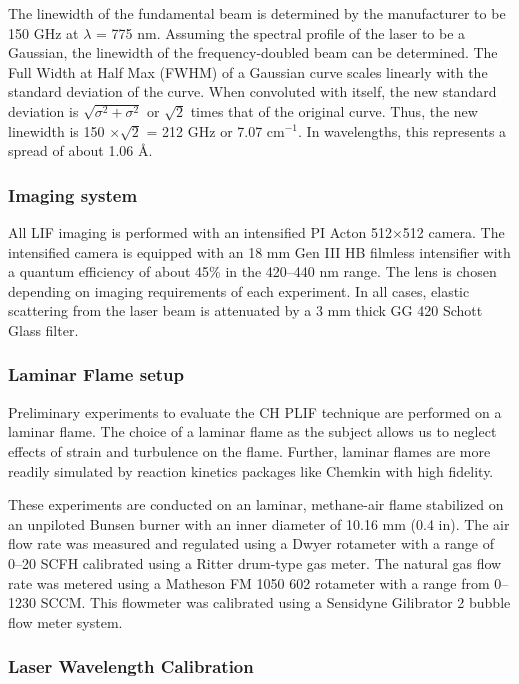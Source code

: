 The linewidth of the fundamental beam is determined by the manufacturer to be 150 GHz at \(\lambda\) = 775 nm.
Assuming the spectral profile of the laser to be a Gaussian, the linewidth of the frequency-doubled beam can be determined.
The Full Width at Half Max (FWHM) of a Gaussian curve scales linearly with the standard deviation of the curve.
When convoluted with itself, the new standard deviation is \(\sqrt{\sigma^2 + \sigma^2}\) or \(\sqrt{2}\) times that of the original curve.
Thus, the new linewidth is 150 \(\times\sqrt{2}\) = 212 GHz or 7.07 cm\(^{-1}\).
In wavelengths, this represents a spread of about 1.06 \AA.

\subsubsection{Imaging system}
\label{sec:imagingsystem}

All LIF imaging is performed with an intensified PI Acton 512\(\times\)512 camera.
The intensified camera is equipped with an 18 mm Gen III HB filmless intensifier with a quantum efficiency of about 45\% in the 420--440 nm range.
The lens is chosen depending on imaging requirements of each experiment.
In all cases, elastic scattering from the laser beam is attenuated by a 3 mm thick GG 420 Schott Glass filter.

\subsubsection{Laminar Flame setup}
\label{sec:laminarflamesetup}

Preliminary experiments to evaluate the CH PLIF technique are performed on a laminar flame.
The choice of a laminar flame as the subject allows us to neglect effects of strain and turbulence on the flame.
Further, laminar flames are more readily simulated by reaction kinetics packages like Chemkin with high fidelity.

These experiments are conducted on an laminar, methane-air flame stabilized on an unpiloted Bunsen burner with an inner diameter of 10.16 mm (0.4 in).
The air flow rate was measured and regulated using a Dwyer rotameter with a range of 0--20 SCFH calibrated using a Ritter drum-type gas meter.
The natural gas flow rate was metered using a Matheson FM 1050 602 rotameter with a range from 0--1230 SCCM.
This flowmeter was calibrated using a Sensidyne Gilibrator 2 bubble flow meter system.

\subsubsection{Laser Wavelength Calibration}

